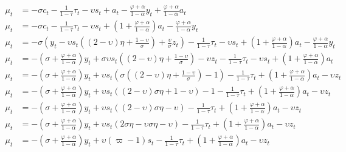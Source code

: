 \begin{align}
   \mu_t &= -\sigma c_t - \frac{1}{1-\tau}\tau_t - \upsilon s_t + a_t -\frac{\varphi + \alpha}{1-\alpha}y_t + \frac{\varphi + \alpha}{1-\alpha}a_t\\
   \mu_t &= -\sigma c_t - \frac{1}{1-\tau}\tau_t - \upsilon s_t + \left(1 + \frac{\varphi + \alpha}{1-\alpha}\right)a_t -\frac{\varphi + \alpha}{1-\alpha}y_t \\
   \mu_t &= -\sigma \left(y_t - \upsilon s_t \left( (2-\upsilon)\eta + \frac{1-\upsilon}{\sigma}\right) + \frac{\upsilon}{\sigma}z_t\right) - \frac{1}{1-\tau}\tau_t - \upsilon s_t + \left(1 + \frac{\varphi + \alpha}{1-\alpha}\right)a_t -\frac{\varphi + \alpha}{1-\alpha}y_t \\
   \mu_t &= -\left(\sigma + \frac{\varphi + \alpha}{1-\alpha}\right)y_t + \sigma \upsilon s_t \left( (2-\upsilon)\eta + \frac{1-\upsilon}{\sigma}\right) - \upsilon z_t- \frac{1}{1-\tau}\tau_t - \upsilon s_t + \left(1 + \frac{\varphi + \alpha}{1-\alpha}\right)a_t \\
   \mu_t &= -\left(\sigma + \frac{\varphi + \alpha}{1-\alpha}\right)y_t + \upsilon s_t \left(\sigma  \left( (2-\upsilon)\eta + \frac{1-\upsilon}{\sigma}\right)- 1 \right) - \frac{1}{1-\tau}\tau_t  + \left(1 + \frac{\varphi + \alpha}{1-\alpha}\right)a_t - \upsilon z_t\\
   \mu_t &= -\left(\sigma + \frac{\varphi + \alpha}{1-\alpha}\right)y_t + \upsilon s_t \left( (2-\upsilon)\sigma \eta + {1-\upsilon}\right)- 1 - \frac{1}{1-\tau}\tau_t  + \left(1 + \frac{\varphi + \alpha}{1-\alpha}\right)a_t - \upsilon z_t\\
   \mu_t &= -\left(\sigma + \frac{\varphi + \alpha}{1-\alpha}\right)y_t + \upsilon s_t \left( (2-\upsilon)\sigma \eta -\upsilon\right) - \frac{1}{1-\tau}\tau_t  + \left(1 + \frac{\varphi + \alpha}{1-\alpha}\right)a_t - \upsilon z_t\\
   \mu_t &= -\left(\sigma + \frac{\varphi + \alpha}{1-\alpha}\right)y_t + \upsilon s_t \left( 2\sigma \eta-\upsilon\sigma \eta -\upsilon\right) - \frac{1}{1-\tau}\tau_t  + \left(1 + \frac{\varphi + \alpha}{1-\alpha}\right)a_t - \upsilon z_t\\
   \mu_t &= -\left(\sigma + \frac{\varphi + \alpha}{1-\alpha}\right)y_t + \upsilon (\varpi - 1) s_t - \frac{1}{1-\tau}\tau_t  + \left(1 + \frac{\varphi + \alpha}{1-\alpha}\right)a_t - \upsilon z_t
\end{align}

